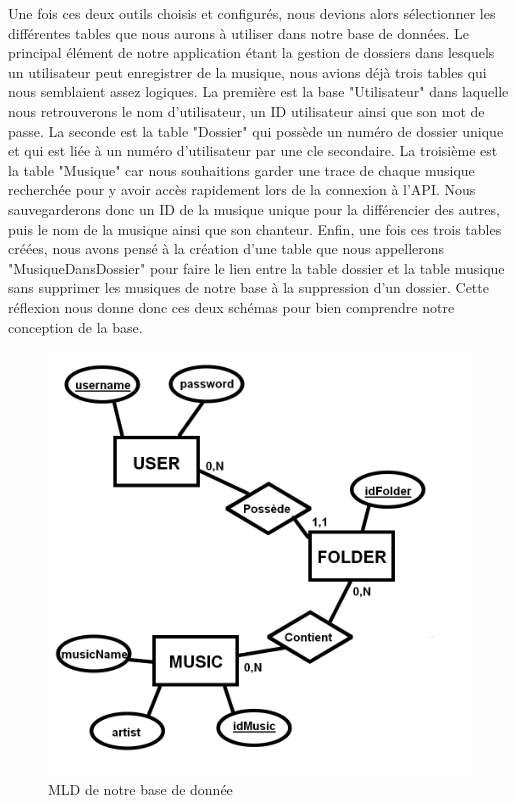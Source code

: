 \documentclass[12pt,french]{article}
\begin{document}
Une fois ces deux outils choisis et configurés, nous devions alors sélectionner les différentes \gls{table}s que nous aurons à utiliser dans notre base de données. Le principal élément de notre application étant la gestion de dossiers dans lesquels un utilisateur peut enregistrer de la musique, nous avions déjà trois \gls{table}s qui nous semblaient assez logiques. La première est la base "Utilisateur" dans laquelle nous retrouverons le nom d'utilisateur, un ID utilisateur ainsi que son mot de passe. La seconde est la \gls{table} "Dossier" qui possède un numéro de dossier unique et qui est liée à un numéro d'utilisateur par une \gls{cle} secondaire. La troisième est la \gls{table} "Musique" car nous souhaitions garder une trace de chaque musique recherchée pour y avoir accès rapidement lors de la connexion à l'\gls{API}. Nous sauvegarderons donc un ID de la musique unique pour la différencier des autres, puis le nom de la musique ainsi que son chanteur. Enfin, une fois ces trois \gls{table}s créées, nous avons pensé à la création d'une \gls{table} que nous appellerons "MusiqueDansDossier" pour faire le lien entre la \gls{table} dossier et la \gls{table} musique sans supprimer les musiques de notre base à la suppression d'un dossier. Cette réflexion nous donne donc ces deux schémas pour bien comprendre notre conception de la base.

\begin{figure}[H]
	\centering
	\includegraphics[scale=0.3]{diag_database.png}
	\caption{MLD de notre base de donnée}    
\end{figure}
\end{document}
